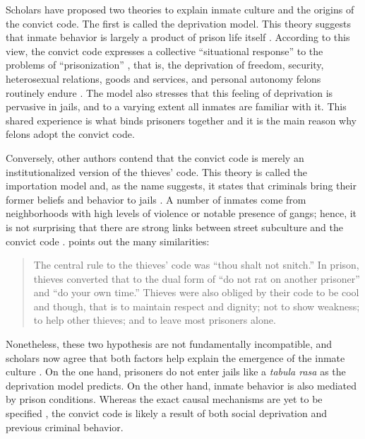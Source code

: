 \documentclass[a4paper, 12pt]{article}
\begin{document}
Scholars have proposed two theories to explain inmate culture and the origins of the convict code. The first is called the deprivation model. This theory suggests that inmate behavior is largely a product of prison life itself \citep{clemmer1940prison,irwin1980prisons,mccorkle1954resocialization}. According to this view, the convict code expresses a collective ``situational response'' \citep{akers1977prisonization} to the problems of ``prisonization'' \citep{clemmer1940prison}, that is, the deprivation of freedom, security, heterosexual relations, goods and services, and personal autonomy felons routinely endure \citep{sykes1958society}. The model also stresses that this feeling of deprivation is pervasive in jails, and to a varying extent all inmates are familiar with it. This shared experience is what binds prisoners together and it is the main reason why felons adopt the convict code.

Conversely, other authors contend that the convict code is merely an institutionalized version of the thieves' code. This theory is called the importation model and, as the name suggests, it states that criminals bring their former beliefs and behavior to jails   \citep{irwin1962thieves,irwin1970felon,irwin1980prisons}. A number of inmates come from neighborhoods with high levels of violence or notable presence of gangs; hence, it is not surprising that there are strong links between street subculture and the convict code \citep[p. 96]{sirisutthidacha2014patterns}.  \citet[p. 12]{irwin1980prisons} points out the many similarities: 

\begin{quote}
The central rule to the thieves' code was ``thou shalt not snitch.'' In prison, thieves converted that to the dual form of ``do not rat on another prisoner'' and ``do your own time.'' Thieves were also obliged by their code to be cool and though, that is to maintain respect and dignity; not to show weakness; to help other thieves; and to leave most prisoners alone.
\end{quote}

Nonetheless, these two hypothesis are not fundamentally incompatible, and scholars now agree that both factors help explain the emergence of the inmate culture \citep{schwartz1971pre,trammell2009values}. On the one hand, prisoners do not enter jails like a \textit{tabula rasa} as the deprivation model predicts. On the other hand, inmate behavior is also mediated by prison conditions. Whereas the exact causal mechanisms are yet to be specified \citep{delisi2004gang}, the convict code is likely a result of both social deprivation and previous criminal behavior. 
\end{document}
